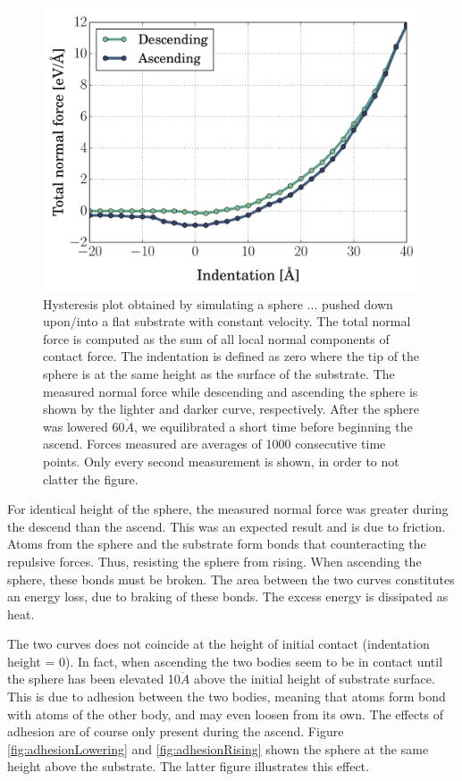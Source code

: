 \documentclass[twoside,english]{uiofysmaster}
\begin{document}
\begin{figure}[H]
\centering
\includegraphics[width=0.7\linewidth]{figures/hysteresis/normal2}
\caption{
	Hysteresis plot obtained by simulating a sphere ... pushed down upon/into a flat substrate with constant velocity. 
	The total normal force is computed as the sum of all local normal components of contact force. The indentation is defined as zero where the tip of the sphere is at the same height as the surface of the substrate.
	The measured normal force while descending and ascending the sphere is shown by the lighter and darker curve, respectively. 
	After the sphere was lowered 60$\mathring{A}$, we equilibrated a short time before beginning the ascend.	
	Forces measured are averages of 1000 consecutive time points.
	Only every second measurement is shown, in order to not clatter the figure.  
	 }
\label{fig:hysteresis}
\end{figure}

\noindent
For identical height of the sphere, the measured normal force was greater during the descend than the ascend. 
This was an expected result and is due to friction. %
Atoms from the sphere and the substrate form bonds that counteracting the repulsive forces. 
Thus, resisting the sphere from rising. 
When ascending the sphere, these bonds must be broken.
The area between the two curves constitutes an energy loss, due to braking of these bonds.
The excess energy is dissipated as heat.

The two curves does not coincide at the height of initial contact (indentation height = 0). 
In fact, when ascending the two bodies seem to be in contact until the sphere has been elevated 10$\mathring{A}$ above the initial height of substrate surface. 
This is due to adhesion between the two bodies, meaning that atoms form bond with atoms of the other body, and may even loosen from its own. 
The effects of adhesion are of course only present during the ascend. 
Figure \ref{fig:adhesionLowering} and \ref{fig:adhesionRising} shown the sphere at the same height above the substrate. The latter figure illustrates this effect.
\end{document}
